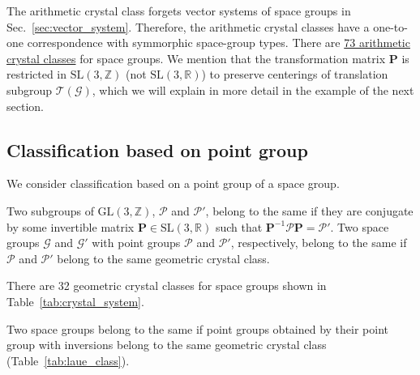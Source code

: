 The arithmetic crystal class forgets vector systems of space groups in Sec.~\ref{sec:vector_system}.
Therefore, the arithmetic crystal classes have a one-to-one correspondence with symmorphic space-group types.
There are \href{https://dictionary.iucr.org/Arithmetic_crystal_class}{73 arithmetic crystal classes} for space groups.
We mention that the transformation matrix $\bm{P}$ is restricted in $\mathrm{SL}(3, \mathbb{Z})$ (not $\mathrm{SL}(3, \mathbb{R})$) to preserve centerings of translation subgroup $\mathcal{T}(\mathcal{G})$, which we will explain in more detail in the example of the next section.

\subsection{\label{sec:geometric-class}Classification based on point group}

We consider classification based on a point group of a space group.

\begin{screen}
  \begin{defn}
    Two subgroups of $\mathrm{GL}(3, \mathbb{Z})$, $\mathcal{P}$ and $\mathcal{P}'$, belong to the same  if they are conjugate by some invertible matrix $\bm{P} \in \mathrm{SL}(3, \mathbb{R})$ such that $\bm{P}^{-1} \mathcal{P} \bm{P} = \mathcal{P}'$.
    Two space groups $\mathcal{G}$ and $\mathcal{G}'$ with point groups $\mathcal{P}$ and $\mathcal{P}'$, respectively, belong to the same  if $\mathcal{P}$ and $\mathcal{P}'$ belong to the same geometric crystal class.
  \end{defn}
\end{screen}

There are 32 geometric crystal classes for space groups shown in Table~\ref{tab:crystal_system}.

Two space groups belong to the same  if point groups obtained by their point group with inversions belong to the same geometric crystal class (Table~\ref{tab:laue_class}).

